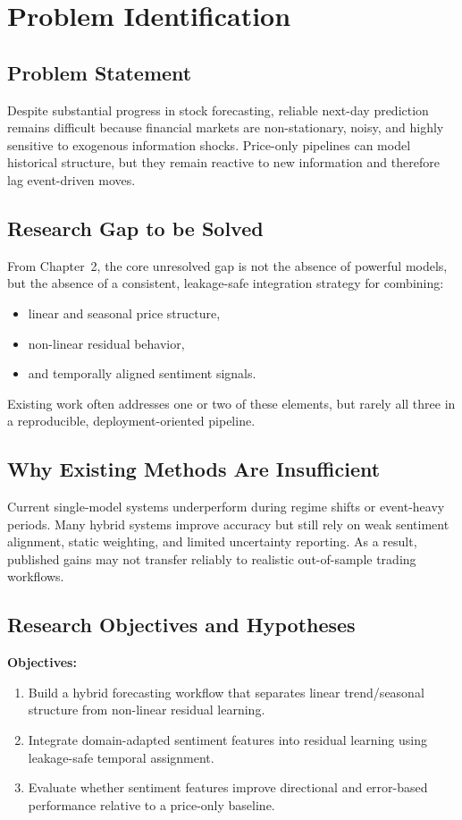 \section{Problem Identification}

\subsection{Problem Statement}
Despite substantial progress in stock forecasting, reliable next-day prediction remains difficult because financial markets are non-stationary, noisy, and highly sensitive to exogenous information shocks. Price-only pipelines can model historical structure, but they remain reactive to new information and therefore lag event-driven moves.

\subsection{Research Gap to be Solved}
From Chapter~2, the core unresolved gap is not the absence of powerful models, but the absence of a consistent, leakage-safe integration strategy for combining:
\begin{itemize}
    \item linear and seasonal price structure,
    \item non-linear residual behavior,
    \item and temporally aligned sentiment signals.
\end{itemize}
Existing work often addresses one or two of these elements, but rarely all three in a reproducible, deployment-oriented pipeline.

\subsection{Why Existing Methods Are Insufficient}
Current single-model systems underperform during regime shifts or event-heavy periods. Many hybrid systems improve accuracy but still rely on weak sentiment alignment, static weighting, and limited uncertainty reporting. As a result, published gains may not transfer reliably to realistic out-of-sample trading workflows.

\subsection{Research Objectives and Hypotheses}
\textbf{Objectives:}
\begin{enumerate}
    \item Build a hybrid forecasting workflow that separates linear trend/seasonal structure from non-linear residual learning.
    \item Integrate domain-adapted sentiment features into residual learning using leakage-safe temporal assignment.
    \item Evaluate whether sentiment features improve directional and error-based performance relative to a price-only baseline.
\end{enumerate}

